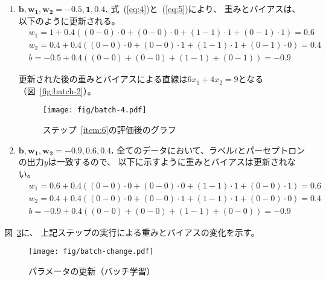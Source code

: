 \begin{enumerate}
  \begin{figure}
    \centering
    \texttt{[image: fig/batch-3.pdf]}
    \caption{ステップ~\ref{item:5}の評価後のグラフ}
    \label{fig:batch-3}
  \end{figure}
\item \textbf{$\boldsymbol{b, w_1, w_2 = -0.5, 1, 0.4}$. }\label{item:6}
  式~(\ref{eq:4})と~(\ref{eq:5})により、
  重みとバイアスは、以下のように更新される。
  \begin{align*}
    &
      w_1 = 1 + 0.4 \left(
      (0 - 0) \cdot 0
     + (0 - 0) \cdot 0
     + (1 - 1) \cdot 1
     + (0 - 1) \cdot 1
      \right) = 0.6
    \\&
      w_2 = 0.4 + 0.4 \left(
    (0 - 0) \cdot 0
     + (0 - 0) \cdot 1
     + (1 - 1) \cdot 1
     + (0 - 1) \cdot 0
      \right) = 0.4
    \\&
      b = -0.5 + 0.4 \left(
    ( 0 - 0)
     + (0 - 0)
     + (1 - 1)
     + (0 - 1)
      \right) = -0.9
  \end{align*}

  更新された後の重みとバイアスによる直線は$6x_1 + 4x_2 = 9$となる
  （図~\ref{fig:batch-2}）。

  \begin{figure}
    \centering
    \texttt{[image: fig/batch-4.pdf]}
    \caption{ステップ~\ref{item:6}の評価後のグラフ}
    \label{fig:batch-3}
  \end{figure}
\item \textbf{$\boldsymbol{b, w_1, w_2 = -0.9, 0.6, 0.4}$. }\label{item:7}
  全てのデータにおいて、ラベル$t$とパーセプトロンの出力$y$は一致するので、
  以下に示すように重みとバイアスは更新されない。
  \begin{align*}
    &
      w_1 = 0.6 + 0.4 \left(
      (0 - 0) \cdot 0
     + (0 - 0) \cdot 0
     + (1 - 1) \cdot 1
     + (0 - 0) \cdot 1
      \right) = 0.6
    \\&
      w_2 = 0.4 + 0.4 \left(
    (0 - 0) \cdot 0
     + (0 - 0) \cdot 1
     + (1 - 1) \cdot 1
     + (0 - 0) \cdot 0
      \right) = 0.4
    \\&
      b = -0.9 + 0.4 \left(
    ( 0 - 0)
     + (0 - 0)
     + (1 - 1)
     + (0 - 0)
      \right) = -0.9
  \end{align*}
\end{enumerate}

図~\ref{fig:batch-change}に、
上記ステップの実行による重みとバイアスの変化を示す。

\begin{figure}
  \centering
  \texttt{[image: fig/batch-change.pdf]}
  \caption{パラメータの更新（バッチ学習）}
  \label{fig:batch-change}
\end{figure}

